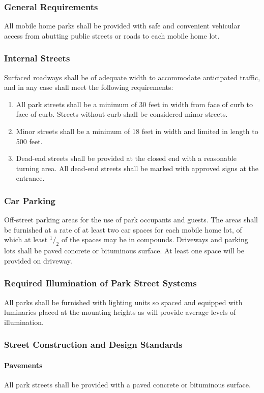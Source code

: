 \subsubsection{General Requirements}
All mobile home parks shall be provided with safe and convenient vehicular access from abutting public streets or roads to each mobile home lot.
\subsubsection{Internal Streets}
Surfaced roadways shall be of adequate width to accommodate anticipated traffic, and in any case shall meet the following requirements:
\begin{enumerate}[{\indent}a)]
    \item All park streets shall be a minimum of 30 feet in width from face of curb to face of curb.  Streets without curb shall be considered minor streets.
    \item Minor streets shall be a minimum of 18 feet in width and limited in length to 500 feet.
    \item Dead-end streets shall be provided at the closed end with a reasonable turning area.  All dead-end streets shall be marked with approved signs at the entrance.
\end{enumerate}
\subsubsection{Car Parking}
Off-street parking areas for the use of park occupants and guests. The areas shall be furnished at a rate of at least two car spaces for each mobile home lot, of which at least ${^1/_2}$ of the spaces may be in compounds. Driveways and parking lots shall be paved concrete or bituminous surface. At least one space will be provided on driveway.
\subsubsection{Required Illumination of Park Street Systems}
All parks shall be furnished with lighting units so spaced and equipped with luminaries placed at the mounting heights as will provide average levels of illumination.
\subsubsection{Street Construction and Design Standards}
\paragraph{Pavements}
All park streets shall be provided with a paved concrete or bituminous surface.
